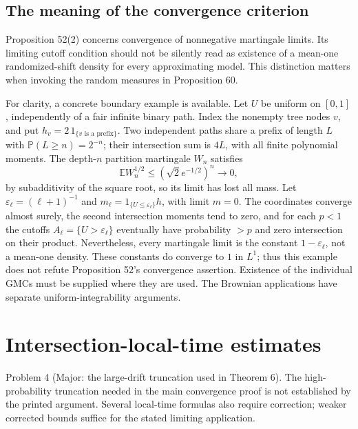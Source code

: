\documentclass[10pt]{article}
\begin{document}
\subsection*{The meaning of the convergence criterion}
Proposition 52(2) concerns convergence of nonnegative martingale limits. Its limiting cutoff condition should not be silently read as existence of a mean-one randomized-shift density for every approximating model. This distinction matters when invoking the random measures in Proposition 60.\par
For clarity, a concrete boundary example is available. Let \(U\) be uniform on \([0,1]\), independently of a fair infinite binary path. Index the nonempty tree nodes \(v\), and put \(h_v=2\,1_{\{v\text{ is a prefix}\}}\). Two independent paths share a prefix of length \(L\) with \(\mathbb P(L\ge n)=2^{-n}\); their intersection sum is \(4L\), with all finite polynomial moments. The depth-\(n\) partition martingale \(W_n\) satisfies \[\mathbb EW_n^{1/2}\le(\sqrt2e^{-1/2})^n\longrightarrow0,\] by subadditivity of the square root, so its limit has lost all mass. Let \(\varepsilon_\ell=(\ell+1)^{-1}\) and \(m_\ell=1_{\{U\le\varepsilon_\ell\}}h\), with limit \(m=0\). The coordinates converge almost surely, the second intersection moments tend to zero, and for each \(p<1\) the cutoffs \(A_\ell=\{U>\varepsilon_\ell\}\) eventually have probability \(>p\) and zero intersection on their product. Nevertheless, every martingale limit is the constant \(1-\varepsilon_\ell\), not a mean-one density. These constants do converge to \(1\) in \(L^1\); thus this example does not refute Proposition 52’s convergence assertion. Existence of the individual GMCs must be supplied where they are used. The Brownian applications have separate uniform-integrability arguments.\par
\section*{Intersection-local-time estimates}
Problem 4 (Major: the large-drift truncation used in Theorem 6).  The high-probability truncation needed in the main convergence proof is not established by the printed argument. Several local-time formulas also require correction; weaker corrected bounds suffice for the stated limiting application.\par
\end{document}
